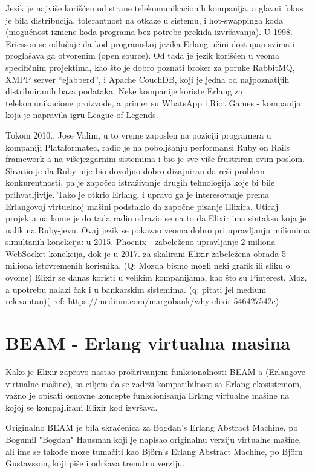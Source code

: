 \documentclass[a4paper]{article}
\begin{document}
Jezik je najviše korišćen od strane telekomunikacionih kompanija, a glavni fokus je bila distribucija, tolerantnost na otkaze u sistemu, i hot-swappinga koda (mogućnost izmene koda programa bez potrebe prekida izvršavanja). U 1998. Ericsson se odlučuje da kod programskoj jezika Erlang učini dostupan svima i proglašava ga otvorenim (open source). Od tada je jezik korišćen u veoma specifičnim projektima, kao što je dobro poznati broker za poruke RabbitMQ, XMPP server “ejabberd”, i Apache CouchDB, koji je jedna od najpoznatijih distribuiranih baza podataka. Neke kompanije koriste Erlang za telekomunikacione proizvode, a primer su WhatsApp i Riot Games - kompanija koja je napravila igru League of Legends.

Tokom 2010., Jose Valim, u to vreme zaposlen na poziciji programera u kompaniji Plataformatec, radio je na poboljšanju performansi Ruby on Rails framework-a na višejezgarnim sistemima i bio je sve više frustriran ovim poslom. Shvatio je da Ruby nije bio dovoljno dobro dizajniran da reši problem konkurentnosti, pa je započeo istraživanje drugih tehnologija koje bi bile prihvatljivije. Tako je otkrio Erlang, i upravo ga je interesovanje prema Erlangovoj virtuelnoj mašini podstaklo da započne pisanje Elixira. Uticaj projekta na kome je do tada radio odrazio se na to da Elixir ima sintaksu koja je nalik na Ruby-jevu. Ovaj jezik se pokazao veoma dobro pri upravljanju milionima simultanih konekcija: u 2015. Phoenix - zabeleženo upravljanje 2 miliona WebSocket konekcija, dok je u 2017. za skalirani Elixir zabeležena obrada 5 miliona istovremenih korisnika. (Q: Mozda bismo mogli neki grafik ili sliku o ovome) Elixir se danas koristi u velikim kompanijama, kao što su Pinterest, Moz, a upotrebu nalazi čak i u bankarskim sistemima. (q: pitati jel medium relevantan)( ref: https://medium.com/margobank/why-elixir-546427542c)

\section{BEAM - Erlang virtualna masina}

Kako je Elixir zapravo nastao proširivanjem funkcionalnosti BEAM-a (Erlangove virtualne mašine), sa ciljem da se zadrži kompatibilnost sa Erlang ekosistemom, važno je opisati osnovne koncepte funkcionisanja Erlang virtualne mašine na kojoj se  kompajlirani Elixir kod izvršava.

Originalno BEAM je bila skraćenica za Bogdan's Erlang Abstract Machine, po Bogumil "Bogdan" Hausman koji je napisao originalnu verziju virtualne mašine, ali ime se takođe moze tumačiti kao Björn's Erlang Abstract Machine, po Björn Gustavsson, koji piše i održava trenutnu verziju.
\end{document}
